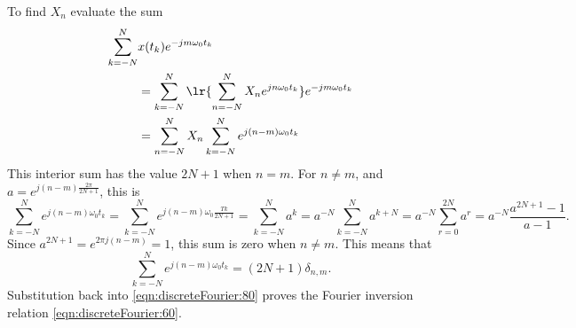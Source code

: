 %
%
To find \( X_n \) evaluate the sum
%
\begin{equation}\label{eqn:discreteFourier:80}
\begin{aligned}
\sum_{k = -N}^N &x(t_k) e^{-j m \omega_0 t_k} \\
&=
\sum_{k = -N}^N
\lr{
\sum_{n = -N}^N X_n e^{ j n \omega_0 t_k}
}
e^{-j m \omega_0 t_k} \\
&=
\sum_{n = -N}^N X_n
\sum_{k = -N}^N
e^{ j (n -m )\omega_0 t_k}
\end{aligned}
\end{equation}
%
This interior sum has the value \( 2 N + 1 \) when \( n = m \).  For \( n \ne m \), and
\( a = e^{j (n -m ) \frac{2 \pi}{2 N + 1}} \), this is
%
\begin{dmath}\label{eqn:discreteFourier:100}
\sum_{k = -N}^N
e^{ j (n -m )\omega_0 t_k}
=
\sum_{k = -N}^N
e^{ j (n -m )\omega_0 \frac{T k}{2 N + 1}}
=
\sum_{k = -N}^N a^k
=
a^{-N} \sum_{k = -N}^N a^{k+ N}
=
a^{-N} \sum_{r = 0}^{2 N} a^{r}
=
a^{-N} \frac{a^{2 N + 1} - 1}{a - 1}.
\end{dmath}
%
Since \( a^{2 N + 1} = e^{2 \pi j (n - m)} = 1 \), this sum is zero when \( n \ne m \).  This means that
%
\begin{equation}\label{eqn:discreteFourier:120}
\sum_{k = -N}^N
e^{ j (n -m )\omega_0 t_k} = (2 N + 1) \delta_{n,m}.
\end{equation}
%
Substitution back into \cref{eqn:discreteFourier:80} proves the Fourier inversion relation \cref{eqn:discreteFourier:60}.
%
%
